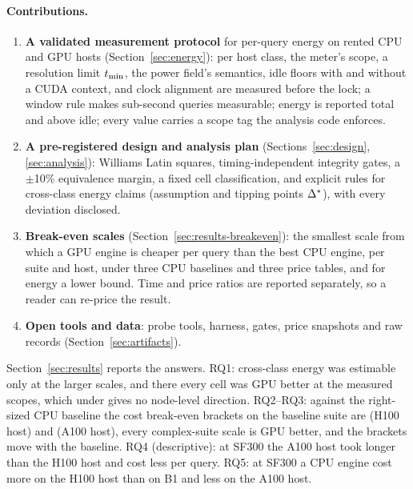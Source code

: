 \documentclass[sigconf]{acmart}
\begin{document}
\paragraph{Contributions.}
\begin{enumerate}
\item \textbf{A validated measurement protocol} for per-query energy on rented CPU and GPU
  hosts (Section~\ref{sec:energy}): per host class, the meter's scope, a resolution limit $t_{\min}$,
  the power field's semantics, idle floors with and without a CUDA context, and clock alignment
  are measured before the lock; a window rule makes sub-second queries measurable; energy is
  reported total and above idle; every value carries a scope tag the analysis code enforces.
\item \textbf{A pre-registered design and analysis plan} (Sections~\ref{sec:design},
  \ref{sec:analysis}): Williams Latin squares, timing-independent integrity gates, a $\pm$10\%
  equivalence margin, a fixed cell classification, and explicit rules for cross-class energy
  claims (assumption \NOne{} and tipping points $\Delta^{*}$), with every deviation disclosed.
\item \textbf{Break-even scales} (Section~\ref{sec:results-breakeven}): the smallest scale
  from which a GPU engine is cheaper per query than the best CPU engine, per suite and host,
  under three CPU baselines and three price tables, and for energy a lower bound. Time and
  price ratios are reported separately, so a reader can re-price the result.
\item \textbf{Open tools and data}: probe tools, harness, gates, price snapshots and raw
  records (Section~\ref{sec:artifacts}).
\end{enumerate}
Section~\ref{sec:results} reports the answers. RQ1: cross-class energy was estimable only at the larger
scales, and there every cell was GPU better at the measured scopes, which under \NOne{} gives no
node-level direction. RQ2--RQ3: against the right-sized CPU baseline the cost break-even brackets on the
baseline suite are  (H100 host) and
 (A100 host), every complex-suite scale is GPU better,
and the brackets move with the baseline. RQ4 (descriptive): at SF300 the A100 host took longer than the
H100 host and cost less per query. RQ5: at SF300 a CPU engine cost more on the H100 host than on B1 and
less on the A100 host.
\end{document}
